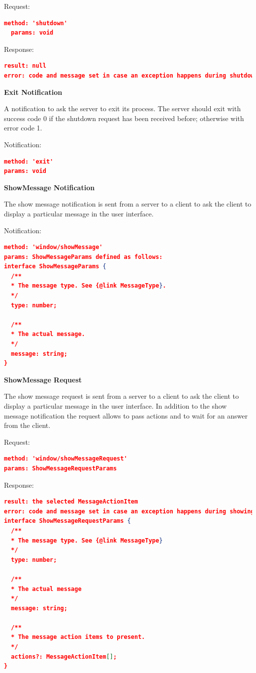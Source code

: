 Request:
\begin{lstlisting}[language=json,firstnumber=1]
  method: 'shutdown'
  params: void
\end{lstlisting}
Response:
\begin{lstlisting}[language=json,firstnumber=1]
result: null
error: code and message set in case an exception happens during shutdown request.
\end{lstlisting}

\textbf{Exit Notification}

A notification to ask the server to exit its process. The server should exit with success code 0 if the shutdown request has been received before; otherwise with error code 1.

Notification:
\begin{lstlisting}[language=json,firstnumber=1]
method: 'exit'
params: void
\end{lstlisting}

\textbf{ShowMessage Notification}

The show message notification is sent from a server to a client to ask the client to display a particular message in the user interface.

Notification:
\begin{lstlisting}[language=json,firstnumber=1]
method: 'window/showMessage'
params: ShowMessageParams defined as follows:
interface ShowMessageParams {
  /**
  * The message type. See {@link MessageType}.
  */
  type: number;
	
  /**
  * The actual message.
  */
  message: string;
}
\end{lstlisting}
\textbf{ShowMessage Request}

The show message request is sent from a server to a client to ask the client to display a particular message in the user interface. In addition to the show message notification the request allows to pass actions and to wait for an answer from the client.

Request:
\begin{lstlisting}[language=json,firstnumber=1]
method: 'window/showMessageRequest'
params: ShowMessageRequestParams
\end{lstlisting}
Response:
\begin{lstlisting}[language=json,firstnumber=1]
result: the selected MessageActionItem
error: code and message set in case an exception happens during showing a message.
interface ShowMessageRequestParams {
  /**
  * The message type. See {@link MessageType}
  */
  type: number;
	
  /**
  * The actual message
  */
  message: string;
	
  /**
  * The message action items to present.
  */
  actions?: MessageActionItem[];
}
\end{lstlisting}

